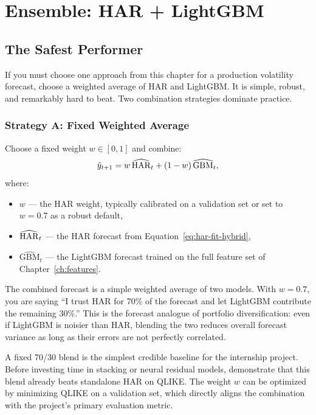 \section{Ensemble: HAR + LightGBM}\label{sec:hybrid:ensemble}

\subsection{The Safest Performer}

If you must choose one approach from this chapter for a production
volatility forecast, choose a weighted average of HAR and LightGBM.
It is simple, robust, and remarkably hard to beat.  Two combination
strategies dominate practice.

\subsubsection{Strategy A: Fixed Weighted Average}

Choose a fixed weight $w \in [0,1]$ and combine:
\begin{equation}\label{eq:weighted-avg}
  \hat{y}_{t+1} = w\,\widehat{\operatorname{HAR}}_t + (1-w)\,\widehat{\text{GBM}}_t,
\end{equation}
where:
\begin{itemize}
  \item $w$ --- the HAR weight, typically calibrated on a validation set
        or set to $w = 0.7$ as a robust default,
  \item $\widehat{\operatorname{HAR}}_t$ --- the HAR forecast from
        Equation~\eqref{eq:har-fit-hybrid},
  \item $\widehat{\text{GBM}}_t$ --- the LightGBM forecast trained on the
        full feature set of Chapter~\ref{ch:features}.
\end{itemize}

\begin{intuition}
The combined forecast is a simple weighted average of two models.  With
$w = 0.7$, you are saying ``I trust HAR for 70\% of the forecast and
let LightGBM contribute the remaining 30\%.''  This is the forecast
analogue of portfolio diversification: even if LightGBM is noisier than
HAR, blending the two reduces overall forecast variance as long as their
errors are not perfectly correlated.
\end{intuition}

\begin{projectconnection}
A fixed 70/30 blend is the simplest credible baseline for the internship
project.  Before investing time in stacking or neural residual models,
demonstrate that this blend already beats standalone HAR on QLIKE.
The weight $w$ can be optimized by minimizing QLIKE on a validation set,
which directly aligns the combination with the project's primary
evaluation metric.
\end{projectconnection}


